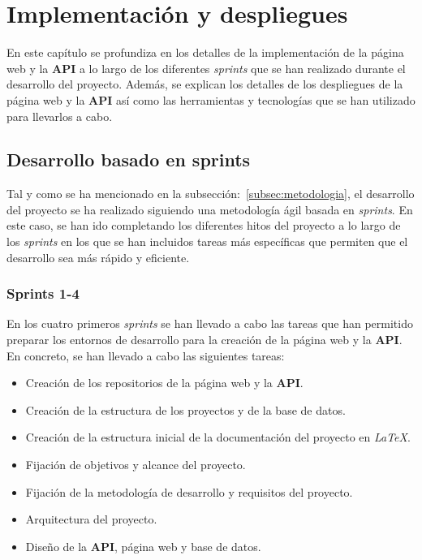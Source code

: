 \chapter{Implementación y despliegues}\label{ch:implementacion-y-despliegues}

En este capítulo se profundiza en los detalles de la implementación de la página web y la \textbf{API} a lo largo de los diferentes
\textit{sprints} que se han realizado durante el desarrollo del proyecto. Además, se explican los detalles de los despliegues
de la página web y la \textbf{API} así como las herramientas y tecnologías que se han utilizado para llevarlos a cabo.

\section{Desarrollo basado en sprints}\label{sec:desarrollo-basado-en-sprints}

Tal y como se ha mencionado en la subsección:~\ref{subsec:metodologia}, el desarrollo del proyecto se ha
realizado siguiendo una metodología ágil basada en \textit{sprints}. En este caso, se han ido completando los diferentes hitos del proyecto a lo largo de los
\textit{sprints} en los que se han incluidos tareas más específicas que permiten que el desarrollo sea más rápido y
eficiente.

\subsection{Sprints 1-4}\label{subsec:sprints-1-4}

En los cuatro primeros \textit{sprints} se han llevado a cabo las tareas que han permitido preparar los entornos de desarrollo
para la creación de la página web y la \textbf{API}. En concreto, se han llevado a cabo las siguientes tareas:

\begin{itemize}
    \item Creación de los repositorios de la página web y la \textbf{API}.
    \item Creación de la estructura de los proyectos y de la base de datos.
    \item Creación de la estructura inicial de la documentación del proyecto en \textit{LaTeX}.
    \item Fijación de objetivos y alcance del proyecto.
    \item Fijación de la metodología de desarrollo y requisitos del proyecto.
    \item Arquitectura del proyecto.
    \item Diseño de la \textbf{API}, página web y base de datos.
\end{itemize}

